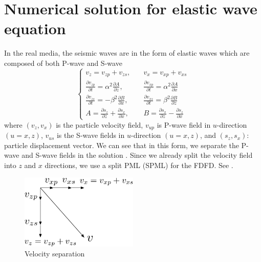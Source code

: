 \documentclass[11pt]{article}
\theoremstyle{plain}
\theoremstyle{definition}
\theoremstyle{remark}
\numberwithin{equation}{section}
\begin{document}
\section{Numerical solution for elastic wave equation}
In the real media, the seismic waves are in the form of elastic waves which are composed of both P-wave and S-wave
\begin{equation}
    \left\{
    \begin{aligned}
    v_z=v_{zp}+v_{zs}, \quad &v_x=v_{xp}+v_{xs}\\
    \frac{\partial v_{zp}}{\partial t}=\alpha^2 \frac{\partial A}{\partial z}, \quad &\frac{\partial v_{xp}}{\partial t}=\alpha^2 \frac{\partial A}{\partial x}\\
    \frac{\partial v_{zs}}{\partial t}=-\beta^2 \frac{\partial B}{\partial x}, \quad &\frac{\partial v_{xs}}{\partial t}=\beta^2 \frac{\partial B}{\partial z}\\
    A=\frac{\partial s_z}{\partial z}+\frac{\partial s_x}{\partial x}, \quad &B=\frac{\partial s_x}{\partial z}-\frac{\partial s_z}{\partial x}
    \end{aligned}
    \right.
    \end{equation}
  where $(v_z, v_x)$ is the particle velocity field, $v_{up}$ is P-wave field in $u$-direction $(u=x, z)$,
  $v_{us}$ is the S-wave fields in $u$-direction $(u=x, z)$, and $(s_z, s_x)$: particle displacement vector.
  We can see that in this form, we separate the P-wave and S-wave fields in the solution \cite{Chen:2014aa}. Since 
  we already split the velocity field into $z$ and $x$ directions, we use a split PML (SPML) for the FDFD. See .
    
\begin{figure}[htbp]
\centering
\includegraphics[width=0.5\textwidth]{Fig/EWCoordinates.pdf}
\caption{Velocity separation}
\end{figure}
\end{document}
